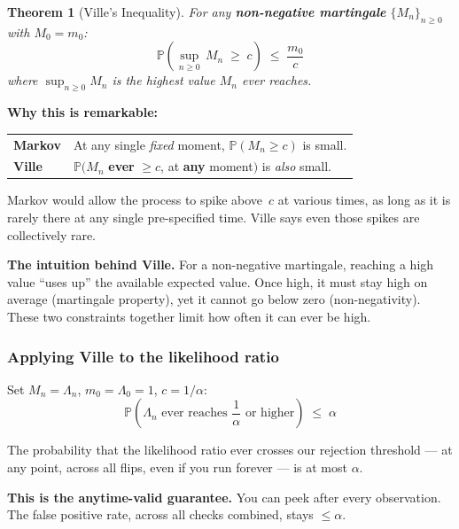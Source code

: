\documentclass[12pt, a4paper]{article}
\newtheorem{theorem}{Theorem}
\newcommand{\Prob}{\mathbb{P}}         %
\newcommand{\LR}{\Lambda}              %
\begin{document}
\begin{theorem}[Ville's Inequality]
For any \textbf{non-negative martingale} $\{M_n\}_{n \geq 0}$ with
$M_0 = m_0$:
\[
  \boxed{\Prob\!\left(\sup_{n \geq 0}\, M_n \;\geq\; c\right)
         \;\leq\; \frac{m_0}{c}}
\]
where $\sup_{n\geq 0} M_n$ is the highest value $M_n$ \emph{ever} reaches.
\end{theorem}

\textbf{Why this is remarkable:}

\begin{center}
\renewcommand{\arraystretch}{1.3}
\begin{tabular}{@{} l p{9cm} @{}}
\toprule
\textbf{Markov} & At any single \emph{fixed} moment, $\Prob(M_n \geq c)$ is small. \\
\textbf{Ville}  & $\Prob(M_n$ \textbf{ever} $\geq c$, at \textbf{any} moment$)$ is \emph{also} small. \\
\bottomrule
\end{tabular}
\end{center}

Markov would allow the process to spike above~$c$ at various times, as long as
it is rarely there at any single pre-specified time.  Ville says even those
spikes are collectively rare.

\textbf{The intuition behind Ville.}
For a non-negative martingale, reaching a high value ``uses up'' the available
expected value.  Once high, it must stay high on average (martingale property),
yet it cannot go below zero (non-negativity).  These two constraints together
limit how often it can ever be high.

\subsubsection*{Applying Ville to the likelihood ratio}

Set $M_n = \LR_n$, $m_0 = \LR_0 = 1$, $c = 1/\alpha$:
\[
  \boxed{\Prob\!\left(\LR_n \text{ ever reaches } \frac{1}{\alpha}
         \text{ or higher}\right) \;\leq\; \alpha}
\]

\begin{plainlanguage}
The probability that the likelihood ratio ever crosses our rejection
threshold --- at any point, across all flips, even if you run forever ---
is at most $\alpha$.

\textbf{This is the anytime-valid guarantee.}  You can peek after every
observation.  The false positive rate, across all checks combined, stays
$\leq \alpha$.
\end{plainlanguage}
\end{document}
